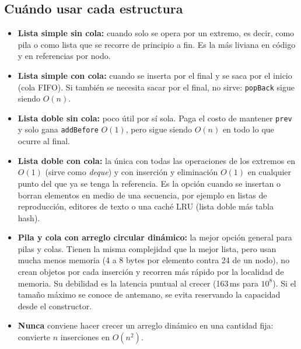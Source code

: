 \documentclass[11pt,a4paper]{article}
\newcommand{\Oone}{$O(1)$}
\newcommand{\On}{$O(n)$}
\begin{document}
\subsection{Cuándo usar cada estructura}
\begin{itemize}
\item \textbf{Lista simple sin cola:} cuando solo se opera por un extremo, es decir, como pila o como
  lista que se recorre de principio a fin. Es la más liviana en código y en referencias por nodo.
\item \textbf{Lista simple con cola:} cuando se inserta por el final y se saca por el inicio (cola
  FIFO). Si también se necesita sacar por el final, no sirve: \texttt{popBack} sigue siendo \On.
\item \textbf{Lista doble sin cola:} poco útil por sí sola. Paga el costo de mantener \texttt{prev} y
  solo gana \texttt{addBefore} \Oone, pero sigue siendo \On{} en todo lo que ocurre al final.
\item \textbf{Lista doble con cola:} la única con todas las operaciones de los extremos en \Oone{}
  (sirve como \emph{deque}) y con inserción y eliminación \Oone{} en cualquier punto del que ya se
  tenga la referencia. Es la opción cuando se insertan o borran elementos en medio de una secuencia,
  por ejemplo en listas de reproducción, editores de texto o una caché LRU (lista doble más tabla hash).
\item \textbf{Pila y cola con arreglo circular dinámico:} la mejor opción general para pilas y colas.
  Tienen la misma complejidad que la mejor lista, pero usan mucha menos memoria (4 a 8 bytes por
  elemento contra 24 de un nodo), no crean objetos por cada inserción y recorren más rápido por la
  localidad de memoria. Su debilidad es la latencia puntual al crecer (163\,ms para $10^8$). Si el
  tamaño máximo se conoce de antemano, se evita reservando la capacidad desde el constructor.
\item \textbf{Nunca} conviene hacer crecer un arreglo dinámico en una cantidad fija: convierte $n$
  inserciones en $O(n^2)$.
\end{itemize}
\end{document}
